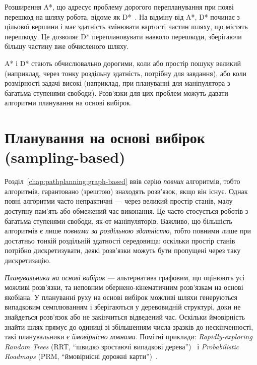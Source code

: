 Розширення A*, що адресує проблему дорогого перепланування при появі перешкод на шляху робота, відоме як D*~\cite{stentz1994optimal}. На відміну від A*, D* починає з цільової вершини і має здатність змінювати вартості частин шляху, що містять перешкоду. Це дозволяє D* переплановувати навколо перешкоди, зберігаючи більшу частину вже обчисленого шляху.

A* і D* стають обчислювально дорогими, коли або простір пошуку великий (наприклад, через тонку роздільну здатність, потрібну для завдання), або коли розмірності задачі високі (наприклад, при плануванні для маніпулятора з багатьма ступенями свободи). Розв'язки для цих проблем можуть давати алгоритми планування на основі вибірок.

\section{Планування на основі вибірок (sampling-based)}

Розділ~\ref{chap:pathplanning:graph-based} ввів серію \emph{повних} алгоритмів, тобто алгоритмів, гарантовано (зрештою) знаходять розв'язок, якщо він існує.
Однак повні алгоритми часто непрактичні — через великий простір станів, малу доступну пам'ять або обмежений час виконання. Це часто стосується роботів з багатьма ступенями свободи, як-от маніпуляторів.
Важливо, що більшість алгоритмів є лише \emph{повними за роздільною здатністю}, тобто повними лише при достатньо тонкій роздільній здатності середовища: оскільки простір станів потрібно дискретизувати, деякі розв'язки можуть бути пропущені через таку дискретизацію.


\emph{Планувальники на основі вибірок} — альтернатива графовим, що оцінюють усі можливі розв'язки, та неповним обернено-кінематичним розв'язкам на основі якобіана.
У плануванні руху на основі вибірок можливі шляхи генеруються випадковим семплюванням і зберігаються у деревовидній структурі, доки не знайдеться розв'язок або не закінчиться відведений час. Оскільки ймовірність знайти шлях прямує до одиниці зі збільшенням числа зразків до нескінченності, такі планувальники є \emph{ймовірнісно повними}. Помітні приклади: \emph{Rapidly-exploring Random Trees} (RRT, ``швидко зростаючі випадкові дерева'')~\cite{lavalle1998rapidly} і \emph{Probabilistic Roadmaps} (PRM, ``ймовірнісні дорожні карти'')~\cite{kavraki1996probabilistic}.

